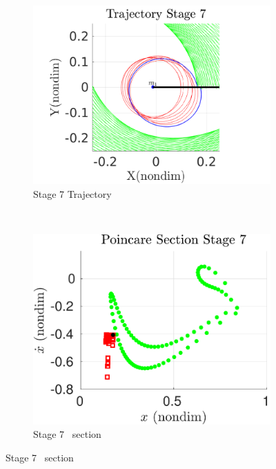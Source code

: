 \documentclass[smallcondensed]{svjour3}
\begin{document}
\begin{figure}[htbp]
    \begin{subfigure}[htbp]{0.5\textwidth} 
        \includegraphics[width=\textwidth, keepaspectratio]{figures/geo_transfer/stage7_trajectory_zoom.pdf} 
        \caption{Stage 7 Trajectory~\label{fig:stage7_trajecotry_zoom}} 
    \end{subfigure}~
    \begin{subfigure}[htbp]{0.5\textwidth} 
        \includegraphics[width=\textwidth, keepaspectratio]{figures/geo_transfer/stage7_poincare.pdf} 
        \caption{Stage 7 \Poincare~section \label{fig:stage7_poincare}} 
    \end{subfigure}
 

\end{figure}
\end{document}
